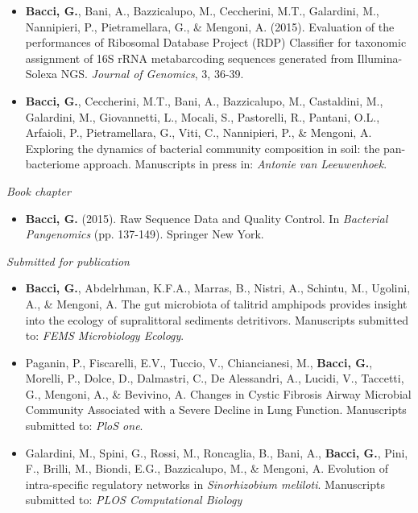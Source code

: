 \begin{itemize}
\item \textbf{Bacci, G.}, Bani, A., Bazzicalupo, M., Ceccherini, M.T., Galardini, M., Nannipieri, P., Pietramellara, G., \& Mengoni, A. (2015). Evaluation of the performances of Ribosomal Database Project (RDP) Classifier for taxonomic assignment of 16S rRNA metabarcoding sequences generated from Illumina-Solexa NGS. \textit{Journal of Genomics}, 3, 36-39.

\item \textbf{Bacci, G.}, Ceccherini, M.T., Bani, A., Bazzicalupo, M., Castaldini, M., Galardini, M., Giovannetti, L., Mocali, S., Pastorelli, R., Pantani, O.L., Arfaioli, P., Pietramellara, G., Viti, C., Nannipieri, P., \& Mengoni, A. Exploring the dynamics of bacterial community composition in soil: the pan-bacteriome approach. Manuscripts in press in: \textit{Antonie van Leeuwenhoek}.

\end{itemize}

\noindent \textit{Book chapter}
\begin{itemize}

\item \textbf{Bacci, G.} (2015). Raw Sequence Data and Quality Control. In \textit{Bacterial Pangenomics} (pp. 137-149). Springer New York.

\end{itemize}


\noindent \textit{Submitted for publication}

\begin{itemize}

\item \textbf{Bacci, G.}, Abdelrhman, K.F.A., Marras, B., Nistri, A., Schintu, M., Ugolini, A., \& Mengoni, A. The gut microbiota of talitrid amphipods provides insight into the ecology of supralittoral sediments detritivors. Manuscripts submitted to: \textit{FEMS Microbiology Ecology}.

\item Paganin, P., Fiscarelli, E.V., Tuccio, V., Chiancianesi, M., \textbf{Bacci, G.}, Morelli, P., Dolce, D., Dalmastri, C., De Alessandri, A., Lucidi, V., Taccetti, G., Mengoni, A., \& Bevivino, A. Changes in Cystic Fibrosis Airway Microbial Community Associated with a Severe Decline in Lung Function. Manuscripts submitted to: \textit{PloS one}.

\item Galardini, M., Spini, G., Rossi, M., Roncaglia, B., Bani, A., \textbf{Bacci, G.}, Pini, F., Brilli, M., Biondi, E.G., Bazzicalupo, M., \& Mengoni, A. Evolution of intra-specific regulatory networks in \textit{Sinorhizobium meliloti}. Manuscripts submitted to: \textit{PLOS Computational Biology}

\end{itemize}


